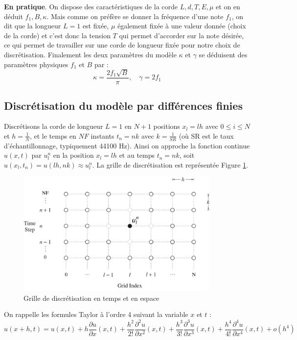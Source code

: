\documentclass[a4,12pt]{article}
\begin{document}
\textbf{En pratique}. On dispose des caractéristiques de la corde $L,d,T,E,\mu$ et on en déduit $f_1,B,\kappa$. Mais comme on préfère se donner la fréquence d'une note $f_1$, on dit que la longueur $L=1$ est fixée, $\mu$ également fixée à une valeur donnée (choix de la corde) et c'est donc la tension $T$ qui permet d'accorder sur la note désirée, ce qui permet de travailler sur une corde de longueur fixée pour notre choix de discrétisation. Finalement les deux paramètres du modèle $\kappa$ et $\gamma$ se déduisent des paramètres physiques $f_1$ et $B$ par : 
\[
\kappa=\frac{2f_1 \sqrt{B}}{\pi}, \quad \gamma=2f_1
\]

\subsection{Discrétisation du modèle par différences finies}

Discrétisons la corde de longueur $L=1$ en $N+1$ positions $x_l=lh$ avec $0\leqslant i\leqslant N$ et $h=\frac{1}{N}$, et le temps en $NF$ instants $t_n=nk$ avec $k=\frac{1}{SR}$ (où SR est le taux d'échantillonnage, typiquement 44100 Hz). Ainsi on approche la fonction continue $u(x,t)$ par $u_l^n$ en la position $x_l=lh$ et au temps $t_n=nk$, soit $u(x_l,t_n)=u(lh,nk)\approx u_l^n$. La grille de discrétisation est représentée Figure \ref{fig:grille}. \\

\begin{figure}
	\begin{center}
		\includegraphics[width=0.9\textwidth]{images/grille.pdf}
		\caption{Grille de discrétisation en temps et en espace }
		\label{fig:grille}
	\end{center}
\end{figure}

On rappelle les formules Taylor à l'ordre 4 suivant la variable $x$ et $t$ : 
\[
u(x+h,t)=u(x,t)+h\frac{\partial u}{\partial x}(x,t)+\frac{h^2}{2!}\frac{\partial^2 u}{\partial x^2}(x,t)+\frac{h^3}{3!}\frac{\partial^3 u}{\partial x^3}(x,t)+\frac{h^4}{4!}\frac{\partial^4 u}{\partial x^4}(x,t)+o(h^4)
\]
\end{document}
